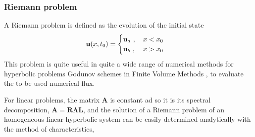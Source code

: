 \documentclass[letterpaper,10pt,english]{jupyterBook}
\begin{document}
\subsubsection{Riemann problem}
\label{\detokenize{ch/pde/hyperbolic:riemann-problem}}
\sphinxAtStartPar
A Riemann problem is defined as the evolution of the initial state
\begin{equation*}
\begin{split}\mathbf{u}(x,t_0) =
  \begin{cases}
  \mathbf{u}_a \ , \hfill \quad x < x_0 \\
  \mathbf{u}_b \ , \hfill \quad x > x_0 \\
\end{cases}\end{split}
\end{equation*}
\sphinxAtStartPar
This problem is quite useful in quite a wide range of numerical methods for hyperbolic problems \sphinxhyphen{} Godunov schemes in Finite Volume Methods \sphinxhyphen{}, to evaluate the  to be used numerical flux.

\sphinxAtStartPar
For linear problems, the matrix \(\mathbf{A}\) is constant ad so it is its spectral decomposition, \(\mathbf{A} = \mathbf{R} \symbf{\Lambda} \mathbf{L}\), and the solution of a Riemann problem of an homogeneous linear hyperbolic system can be easily determined analytically with the method of characteristics,
\end{document}
